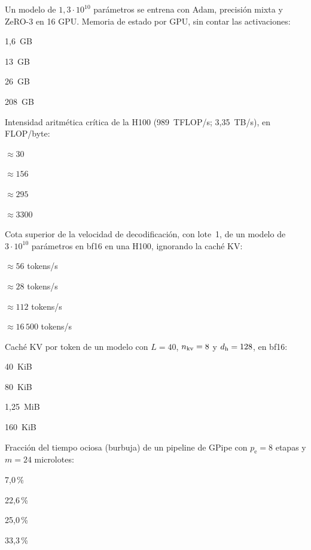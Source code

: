 \begin{cuestiones}
\item {} Un modelo de $1{,}3\cdot 10^{10}$ parámetros se entrena con Adam, precisión mixta y ZeRO-3 en 16 GPU. Memoria de estado por GPU, sin contar las activaciones:
\begin{opciones}
  \item 1{,}6~GB
  \item 13~GB
  \item 26~GB
  \item 208~GB
\end{opciones}

\item {} Intensidad aritmética crítica de la H100 (989~TFLOP/s; 3{,}35~TB/s), en FLOP/byte:
\begin{opciones}
  \item $\approx 30$
  \item $\approx 156$
  \item $\approx 295$
  \item $\approx 3300$
\end{opciones}

\item {} Cota superior de la velocidad de decodificación, con lote~1, de un modelo de $3\cdot 10^{10}$ parámetros en bf16 en una H100, ignorando la caché KV:
\begin{opciones}
  \item $\approx 56$ tokens/s
  \item $\approx 28$ tokens/s
  \item $\approx 112$ tokens/s
  \item $\approx 16\,500$ tokens/s
\end{opciones}

\item {} Caché KV por token de un modelo con $L=40$, $n_{\mathrm{kv}}=8$ y $d_{\mathrm{h}}=128$, en bf16:
\begin{opciones}
  \item 40~KiB
  \item 80~KiB
  \item 1{,}25~MiB
  \item 160~KiB
\end{opciones}

\item {} Fracción del tiempo ociosa (burbuja) de un pipeline de GPipe con $p_{\mathrm{e}}=8$ etapas y $m=24$ microlotes:
\begin{opciones}
  \item 7{,}0\,\%
  \item 22{,}6\,\%
  \item 25{,}0\,\%
  \item 33{,}3\,\%
\end{opciones}


\end{cuestiones}
